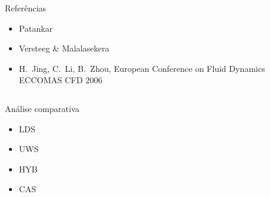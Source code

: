 \documentclass[final,t]{beamer}
\begin{document}
\begin{frame}{}
\begin{columns}[t]
\begin{column}{.488\linewidth}
    \begin{block}{Referências}
        \vskip -0.8cm
        \footnotesize
        \begin{itemize}
            \item Patankar
            \item Versteeg \& Malalasekera
            \item H.~Jing, C.~Li, B.~Zhou, European Conference on Fluid Dynamics
                ECCOMAS CFD 2006
        \end{itemize}
        \normalsize
        \vskip -0.8cm
    \end{block}


\end{column}


\end{columns}

\begin{columns}[t]
\begin{column}{\linewidth}
\begin{exampleblock}{Análise comparativa}
\begin{itemize}
\item LDS
\item UWS
\item HYB
\item CAS
\end{itemize}
\end{exampleblock}

\end{column}
\end{columns}
\end{frame}
\end{document}
